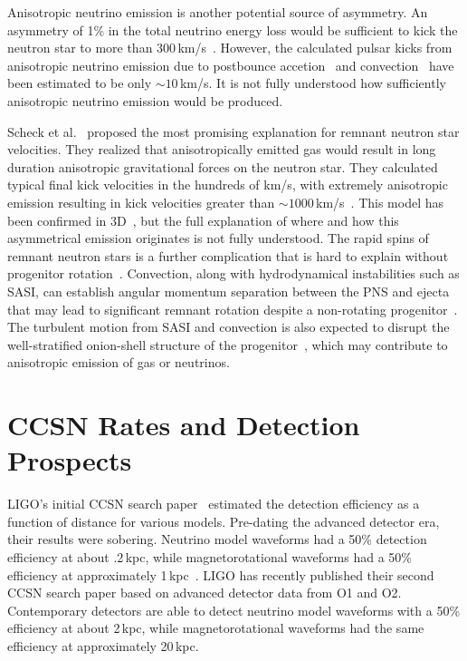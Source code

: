 Anisotropic neutrino emission is another potential source of asymmetry. An asymmetry of 1\% in the total neutrino energy loss would be sufficient to kick the neutron star to more than 300\,km/s~\cite{janka}. However, the calculated pulsar kicks from anisotropic neutrino emission due to postbounce accetion~\cite{scheck2006multidimensional, wongwathanarat2010hydrodynamical} and convection~\cite{blaschke2001physics} have been estimated to be only $\sim10$\,km/s. It is not fully understood how sufficiently anisotropic neutrino emission would be produced.

Scheck et al.~\cite{scheck2006multidimensional, scheck2004pulsar} proposed the most promising explanation for remnant neutron star velocities. They realized that anisotropically emitted gas would result in long duration anisotropic gravitational forces on the neutron star. They calculated typical final kick velocities in the hundreds of km/s, with extremely anisotropic emission resulting in kick velocities greater than $\sim1000$\,km/s~\cite{scheck2006multidimensional}. This model has been confirmed in 3D~\cite{wongwathanarat2010hydrodynamical}, but the full explanation of where and how this asymmetrical emission originates is not fully understood. The rapid spins of remnant neutron stars is a further complication that is hard to explain without progenitor rotation~\cite{heger2005presupernova, ott2006spin}. Convection, along with hydrodynamical instabilities such as SASI, can establish angular momentum separation between the PNS and ejecta that may lead to significant remnant rotation despite a non-rotating progenitor~\cite{blondin2007pulsar, fernandez2010spiral}. The turbulent motion from SASI and convection is also expected to disrupt the well-stratified onion-shell structure of the progenitor~\cite{kifonidis2006non}, which may contribute to anisotropic emission of gas or neutrinos.

\section{CCSN Rates and Detection Prospects}
\label{sec:rates}

LIGO's initial CCSN search paper~\cite{abbott2016first} estimated the detection efficiency as a function of distance for various models. Pre-dating the advanced detector era, their results were sobering. Neutrino model waveforms had a 50\% detection efficiency at about .2\,kpc, while magnetorotational waveforms had a 50\% efficiency at approximately 1\,kpc~\cite{abbott2016first}. LIGO has recently published their second CCSN search paper based on advanced detector data from O1 and O2. Contemporary detectors are able to detect neutrino model waveforms with a 50\% efficiency at about 2\,kpc, while magnetorotational waveforms had the same efficiency at approximately 20\,kpc.

